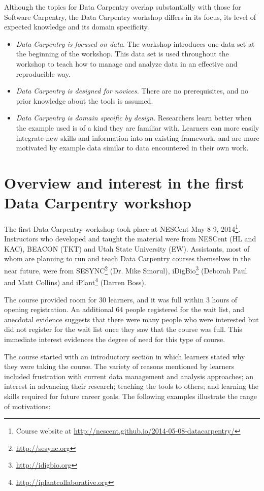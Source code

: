 \documentclass[11pt]{article}
\begin{document}
Although the topics for Data Carpentry overlap substantially with
those for Software Carpentry, the Data Carpentry workshop differs in
its focus, its level of expected knowledge and its domain specificity.
\begin{itemize}
\item \emph{Data Carpentry is focused on data}. The workshop introduces one data set at the beginning of the
workshop. This data set is used throughout the workshop to teach how to manage and analyze data in an effective and reproducible way.
\item \emph{Data Carpentry is designed for novices.} There are no prerequisites, and no 
prior knowledge about the tools is assumed.
\item \emph{Data Carpentry is domain specific by design.} Researchers learn better when the example used is
of a kind they are familiar with. Learners can more easily integrate new skills and information into an existing framework, and 
are more motivated by example data similar to data encountered in their own work.
\end{itemize}

\section{Overview and interest in the first Data Carpentry workshop}

The first Data Carpentry workshop took place at NESCent May 8-9, 2014\footnote{Course website at \url{http://nescent.github.io/2014-05-08-datacarpentry/}}. Instructors who developed and taught the material were from NESCent
(HL and KAC), BEACON (TKT) and Utah State University (EW). Assistants, most of whom are planning to run and teach Data Carpentry courses themselves in the near future, were  from SESYNC\footnote{\url{http://sesync.org}} (Dr. Mike Smorul), iDigBio\footnote{\url{http://idigbio.org}} (Deborah Paul
and Matt Collins) and iPlant\footnote{\url{http://iplantcollaborative.org}} (Darren Boss).

The course provided room for 30 learners, and it was full within 3 hours of opening registration. An additional 64 people registered for the wait list, and anecdotal evidence suggests that there were many people who were interested but did not register for the wait list once they saw that the course was full. This immediate interest evidences the degree of need for this type of course.

The course started with an introductory section in which learners stated why they were taking the course. The variety of reasons mentioned by learners included frustration with current data management and analysis approaches; an interest in advancing their research; teaching the tools to others; and learning the skills required for future career goals. The following examples illustrate the range of motivations:
\end{document}
